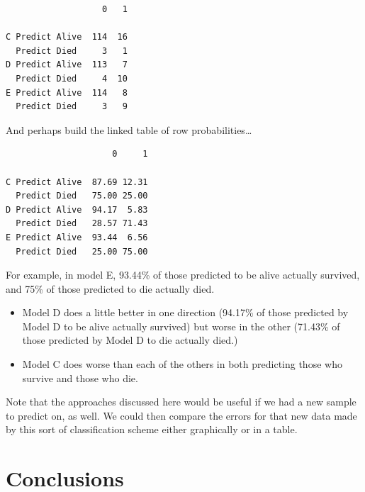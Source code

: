 \documentclass[]{book}
\newenvironment{Shaded}{\begin{snugshade}}{\end{snugshade}}
\newcommand{\KeywordTok}[1]{\textcolor[rgb]{0.13,0.29,0.53}{\textbf{#1}}}
\newcommand{\DecValTok}[1]{\textcolor[rgb]{0.00,0.00,0.81}{#1}}
\newcommand{\OperatorTok}[1]{\textcolor[rgb]{0.81,0.36,0.00}{\textbf{#1}}}
\newcommand{\NormalTok}[1]{#1}
\providecommand{\tightlist}{%
  \setlength{\itemsep}{0pt}\setlength{\parskip}{0pt}}
\theoremstyle{definition}
\theoremstyle{definition}
\theoremstyle{definition}
\theoremstyle{remark}
\begin{document}
\begin{verbatim}
                   0   1
                        
C Predict Alive  114  16
  Predict Died     3   1
D Predict Alive  113   7
  Predict Died     4  10
E Predict Alive  114   8
  Predict Died     3   9
\end{verbatim}

And perhaps build the linked table of row probabilities\ldots{}

\begin{Shaded}
\end{Shaded}

\begin{verbatim}
                     0     1
                            
C Predict Alive  87.69 12.31
  Predict Died   75.00 25.00
D Predict Alive  94.17  5.83
  Predict Died   28.57 71.43
E Predict Alive  93.44  6.56
  Predict Died   25.00 75.00
\end{verbatim}

For example, in model E, 93.44\% of those predicted to be alive actually
survived, and 75\% of those predicted to die actually died.

\begin{itemize}
\tightlist
\item
  Model D does a little better in one direction (94.17\% of those
  predicted by Model D to be alive actually survived) but worse in the
  other (71.43\% of those predicted by Model D to die actually died.)
\item
  Model C does worse than each of the others in both predicting those
  who survive and those who die.
\end{itemize}

Note that the approaches discussed here would be useful if we had a new
sample to predict on, as well. We could then compare the errors for that
new data made by this sort of classification scheme either graphically
or in a table.

\section{Conclusions}\label{conclusions}
\end{document}
